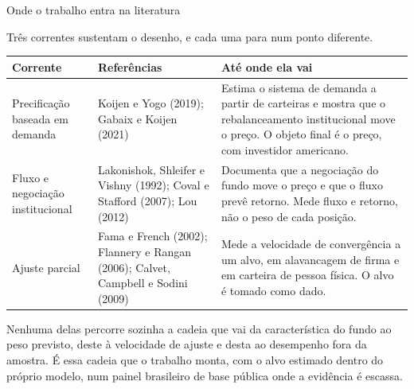 \documentclass[aspectratio=169,11pt]{beamer}
\begin{document}
\begin{frame}{Onde o trabalho entra na literatura}

Três correntes sustentam o desenho, e cada uma para num ponto diferente.

\vspace{0.35em}
\centering
\footnotesize
\begin{tabular}{@{}p{2.7cm}p{4.2cm}p{6.9cm}@{}}
\toprule
Corrente & Referências & Até onde ela vai \\
\midrule
Precificação baseada em demanda
& Koijen e Yogo (2019); Gabaix e Koijen (2021)
& Estima o sistema de demanda a partir de carteiras e mostra que o
  rebalanceamento institucional move o preço. O objeto final é o preço, com
  investidor americano. \\[0.3em]
Fluxo e negociação institucional
& Lakonishok, Shleifer e Vishny (1992); Coval e Stafford (2007); Lou (2012)
& Documenta que a negociação do fundo move o preço e que o fluxo prevê retorno.
  Mede fluxo e retorno, não o peso de cada posição. \\[0.3em]
Ajuste parcial
& Fama e French (2002); Flannery e Rangan (2006); Calvet, Campbell e Sodini (2009)
& Mede a velocidade de convergência a um alvo, em alavancagem de firma e em
  carteira de pessoa física. O alvo é tomado como dado. \\
\bottomrule
\end{tabular}

\vspace{0.45em}
\raggedright
\small
Nenhuma delas percorre sozinha a cadeia que vai da característica do fundo ao peso previsto,
deste à velocidade de ajuste e desta ao desempenho fora da amostra. É essa cadeia que o
trabalho monta, com o alvo estimado dentro do próprio modelo, num painel brasileiro de base
pública onde a evidência é escassa.

\end{frame}
\end{document}
